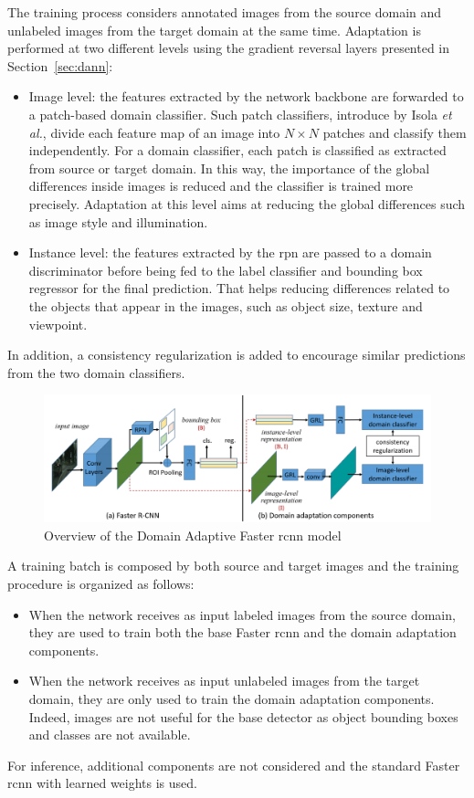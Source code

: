 \documentclass[%
    corpo=12pt,
    twoside,
    stile=classica,   
    tipotesi=magistrale,
    evenboxes,
    english
]{toptesi}
\begin{document}
The training process considers annotated images from the source domain and unlabeled images from the target domain at the same time. Adaptation is performed at two different levels  using the gradient reversal layers presented in Section~\ref{sec:dann}:

\begin{itemize}
	\item Image level: the features extracted by the network backbone are forwarded to a patch-based domain classifier. Such patch classifiers, introduce by Isola \textit{et al.}\cite{isola2018imagetoimage}, divide each feature map of an image into $ N\times N $ patches and classify them independently. For a domain classifier, each patch is classified as extracted from source or target domain. In this way, the importance of the global differences inside images is reduced and the classifier is trained more precisely. Adaptation at this level aims at reducing the global differences such as image style and illumination.
	\item Instance level: the features extracted by the \gls{rpn} are passed to a domain discriminator before being fed to the label classifier and bounding box regressor for the final prediction. That helps reducing differences related to the objects that appear in the images, such as object size, texture and viewpoint.
\end{itemize}
In addition, a consistency regularization is added to encourage similar predictions from the two domain classifiers.

\begin{figure}[ht!]
	\centering
	\includegraphics[width=0.9\linewidth]{imgs/dafasterrcnn.png}
	\caption{Overview of the Domain Adaptive Faster \gls{rcnn} model\cite{chen2018domain}}
	\label{fig:dafasterrcnn}
\end{figure}

A training batch is composed by both source and target images and the training procedure is organized as follows:
\begin{itemize}
	\item When the network receives as input labeled images from the source domain, they are used to train both the base Faster \gls{rcnn} and the domain adaptation components.
	\item When the network receives as input unlabeled images from the target domain, they are only used to train the domain adaptation components. Indeed, images are not useful for the base detector as object bounding boxes and classes are not available.
\end{itemize}
For inference, additional components are not considered and the standard Faster \gls{rcnn} with learned weights is used.
\end{document}
